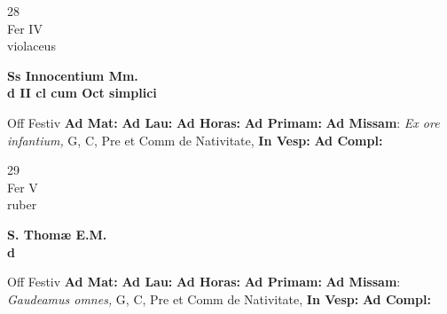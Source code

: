 \documentclass[10pt, openany]{book}
\begin{document}
    \begin{center}
        \begin{minipage}{3.5in}
            \vspace{2em}
            \begin{minipage}{0.5in}
                {\Huge 28} \\
                {\normalsize Fer IV} \\
                {\normalsize violaceus}
            \end{minipage}
            \begin{minipage}{3.0in}
                \textbf{ \large Ss Innocentium Mm. \\
                \textnormal{\normalsize d II cl cum Oct simplici}} \\ 
            \end{minipage}
            \begin{justify}Off Festiv
                \textbf{Ad Mat: }
                \textbf{Ad Lau: }
                \textbf{Ad Horas: }
                \textbf{Ad Primam: }\textbf{Ad Missam}: \textit{Ex ore infantium,} G, C, Pre et Comm de Nativitate,  
                \textbf{In Vesp: }
                \textbf{Ad Compl: }
            \end{justify}
        \end{minipage}
    \end{center}

    \begin{center}
        \begin{minipage}{3.5in}
            \vspace{2em}
            \begin{minipage}{0.5in}
                {\Huge 29} \\
                {\normalsize Fer V} \\
                {\normalsize ruber}
            \end{minipage}
            \begin{minipage}{3.0in}
                \textbf{ \large S. Thomæ E.M. \\
                \textnormal{\normalsize d}} \\ 
            \end{minipage}
            \begin{justify}Off Festiv
                \textbf{Ad Mat: }
                \textbf{Ad Lau: }
                \textbf{Ad Horas: }
                \textbf{Ad Primam: }\textbf{Ad Missam}: \textit{Gaudeamus omnes,} G, C, Pre et Comm de Nativitate,  
                \textbf{In Vesp: }
                \textbf{Ad Compl: }
            \end{justify}
        \end{minipage}
    \end{center}
\end{document}
